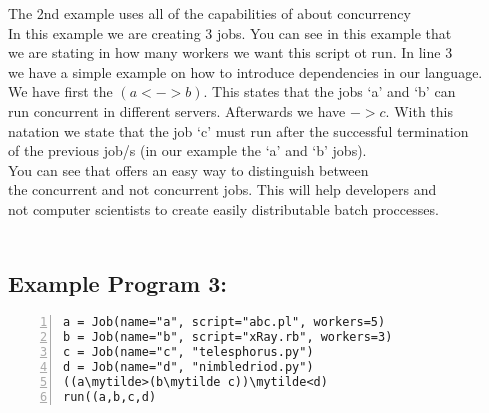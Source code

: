 The 2nd example uses all of the capabilities of \lang{} about concurrency\\
In this example we are creating 3 jobs. You can see in this example that\\
we are stating in how many workers we want this script ot run. In line 3\\
we have a simple example on how to introduce dependencies in our language.\\
We have first the $(a <-> b)$. This states that the jobs `a' and `b' can\\
run concurrent in different servers. Afterwards we have $-> c$. With this\\
natation we state that the job `c' must run after the successful termination\\
of the previous job/s (in our example the `a' and `b' jobs).\\

You can see that \lang{} offers an easy way to distinguish between\\
the concurrent and not concurrent jobs. This will help developers and\\
not computer scientists to create easily distributable batch proccesses.\\
\\

\subsection*{Example Program 3:}
\begin{Verbatim}[numbers=left,commandchars=\\\{\}]
a = Job(name="a", script="abc.pl", workers=5)
b = Job(name="b", script="xRay.rb", workers=3)
c = Job(name="c", "telesphorus.py")
d = Job(name="d", "nimbledriod.py")
((a\mytilde>(b\mytilde c))\mytilde<d)
run((a,b,c,d)
\end{Verbatim}

